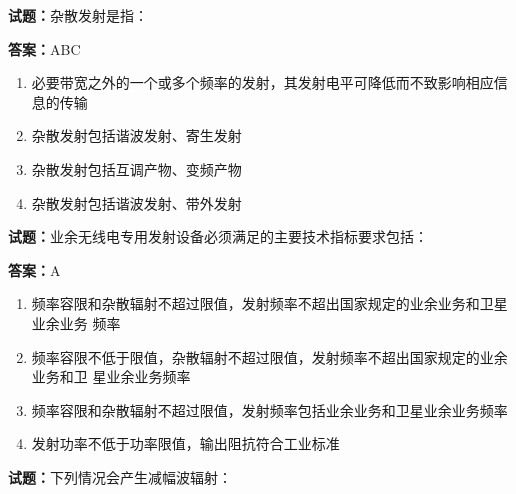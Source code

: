 \documentclass{ctexbook}
\begin{document}




\vspace{1em}

\textbf{试题：}杂散发射是指： 

\textbf{答案：}ABC 

\begin{enumerate}[leftmargin=3em]
  \item 必要带宽之外的一个或多个频率的发射，其发射电平可降低而不致影响相应信息的传输 

  \item 杂散发射包括谐波发射、寄生发射 

  \item 杂散发射包括互调产物、变频产物 

  \item 杂散发射包括谐波发射、带外发射 

\end{enumerate}





\vspace{1em}

\textbf{试题：}业余无线电专用发射设备必须满足的主要技术指标要求包括： 

\textbf{答案：}A 

\begin{enumerate}[leftmargin=3em]
  \item 频率容限和杂散辐射不超过限值，发射频率不超出国家规定的业余业务和卫星业余业务
频率 

  \item 频率容限不低于限值，杂散辐射不超过限值，发射频率不超出国家规定的业余业务和卫
星业余业务频率 

  \item 频率容限和杂散辐射不超过限值，发射频率包括业余业务和卫星业余业务频率 

  \item 发射功率不低于功率限值，输出阻抗符合工业标准 


\end{enumerate}





\vspace{1em}

\textbf{试题：}下列情况会产生减幅波辐射： 
\end{document}

